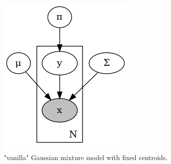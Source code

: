 \documentclass[11pt, a4paper]{report}
\theoremstyle{plain}
\theoremstyle{definition}
\theoremstyle{remark}
\begin{document}
\begin{figure}[h]
\centering
\begin{subfigure}[b]{0.4\textwidth}
\includegraphics[width=\textwidth]{plots/mm.gv.png}
\caption{"vanilla" Gaussian mixture model with fixed centroids.}
\label{fig:vanillamix}
\end{subfigure}
\begin{subfigure}[t]{0.4\textwidth}

\end{subfigure}
\end{figure}
\end{document}
